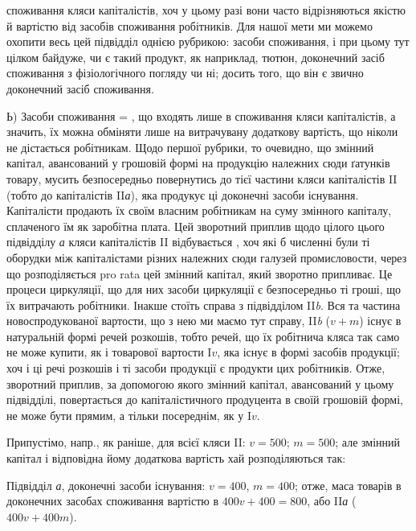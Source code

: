 \parcont{}  %
споживання кляси капіталістів, хоч у цьому разі вони часто відрізняються
якістю й вартістю від засобів споживання робітників. Для нашої мети
ми можемо охопити весь цей підвідділ однією рубрикою: 
засоби споживання, і при цьому тут цілком байдуже, чи є такий продукт,
як наприклад, тютюн, доконечний засіб споживання з фізіологічного
погляду чи ні; досить того, що він є звично доконечний засіб споживання.

Ь) Засоби споживання = , що входять лише в
споживання кляси капіталістів, а значить, їх можна обміняти лише на
витрачувану додаткову вартість, що ніколи не дістається робітникам.
Щодо першої рубрики, то очевидно, що змінний капітал, авансований у
грошовій формі на продукцію належних сюди ґатунків товару, мусить
безпосередньо повернутись до тієї частини кляси капіталістів II (тобто
до капіталістів II\emph{а}), яка продукує ці доконечні засоби існування.
Капіталісти продають їх своїм власним робітникам на суму змінного капіталу,
сплаченого їм як заробітна плата. Цей зворотний приплив щодо цілого
цього підвідділу \emph{а} кляси капіталістів II відбувається ,
хоч які б численні були ті оборудки між капіталістами різних належних
сюди галузей промисловости, через що розподіляється pro rata
цей змінний капітал, який зворотно припливає. Це процеси циркуляції,
що для них засоби циркуляції є безпосередньо ті гроші, що їх витрачають
робітники. Інакше стоїть справа з підвідділом II\emph{b}. Вся та частина
новоспродукованої вартости, що з нею ми маємо тут справу, II\emph{b} ($v + m$)
існує в натуральній формі речей розкошів, тобто речей, що їх робітнича
кляса так само не може купити, як і товарової вартости I$v$, яка існує
в формі засобів продукції; хоч і ці речі розкошів і ті засоби продукції
є продукти цих робітників. Отже, зворотний приплив, за допомогою
якого змінний капітал, авансований у цьому підвідділі, повертається до
капіталістичного продуцента в своїй грошовій формі, не може бути
прямим, а тільки посереднім, як у I$v$.

Припустімо, напр., як раніше, для всієї кляси II: $v = 500$; $m = 500$;
але змінний капітал і відповідна йому додаткова вартість хай розподіляються
так:

Підвідділ \emph{а}, доконечні засоби існування: $v = 400$, $m = 400$; отже,
маса товарів в доконечних засобах споживання вартістю в $400 v + 400 = 800$,
або II\emph{а} ($400 v + 400 m$).

